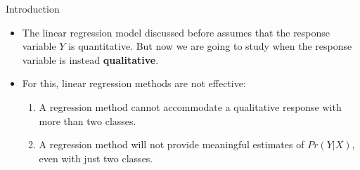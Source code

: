 \begin{frame}{Introduction}

\begin{itemize}
    \item The linear regression model discussed before assumes that the response variable $Y$ is quantitative. But now we are going to study when the response
variable is instead \textbf{qualitative}. \pause

    \item For this, linear regression methods are not effective: \pause
        \begin{enumerate}
            \item A regression method cannot accommodate a qualitative response with more than two classes. \pause
            \item A regression method will not provide meaningful estimates of $Pr(Y |X)$, even with just two classes. \pause
        \end{enumerate}
\end{itemize}
    
\end{frame}